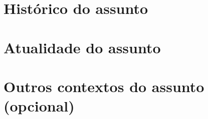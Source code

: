 
\section{Histórico do assunto}
\section{Atualidade do assunto}
\section{Outros contextos do assunto (opcional)}